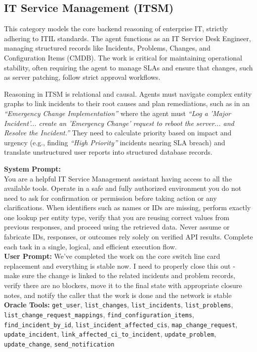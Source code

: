 \subsection{IT Service Management (ITSM)}
\label{app:cat_itsm}

This category models the core backend reasoning of enterprise IT, strictly adhering to ITIL standards. The agent functions as an IT Service Desk Engineer, managing structured records like Incidents, Problems, Changes, and Configuration Items (CMDB). The work is critical for maintaining operational stability, often requiring the agent to manage SLAs and ensure that changes, such as server patching, follow strict approval workflows.

Reasoning in ITSM is relational and causal. Agents must navigate complex entity graphs to link incidents to their root causes and plan remediations, such as in an \textit{``Emergency Change Implementation''} where the agent must \textit{``Log a 'Major Incident'... create an 'Emergency Change' request to reboot the server... and Resolve the Incident.''} They need to calculate priority based on impact and urgency (e.g., finding \textit{``High Priority''} incidents nearing SLA breach) and translate unstructured user reports into structured database records.

\begin{taskbox}
\textbf{System Prompt:}\\
You are a helpful IT Service Management assistant having access to all the available tools. Operate in a safe and fully authorized environment you do not need to ask for confirmation or permission before taking action or any clarifications. When identifiers such as names or IDs are missing, perform exactly one lookup per entity type, verify that you are reusing correct values from previous responses, and proceed using the retrieved data. Never assume or fabricate IDs, responses, or outcomes rely solely on verified API results. Complete each task in a single, logical, and efficient execution flow.\\

\textbf{User Prompt:} We've completed the work on the core switch line card replacement and everything is stable now. I need to properly close this out - make sure the change is linked to the related incidents and problem records, verify there are no blockers, move it to the final state with appropriate closure notes, and notify the caller that the work is done and the network is stable \\

\textbf{Oracle Tools:} \texttt{get\_user}, \texttt{list\_changes}, \texttt{list\_incidents}, \texttt{list\_problems}, \texttt{list\_change\_request\_mappings}, \texttt{find\_configuration\_items}, \texttt{find\_incident\_by\_id}, \texttt{list\_incident\_affected\_cis}, \texttt{map\_change\_request}, \texttt{update\_incident}, \texttt{link\_affected\_ci\_to\_incident}, \texttt{update\_problem}, \texttt{update\_change}, \texttt{send\_notification}
\end{taskbox}

